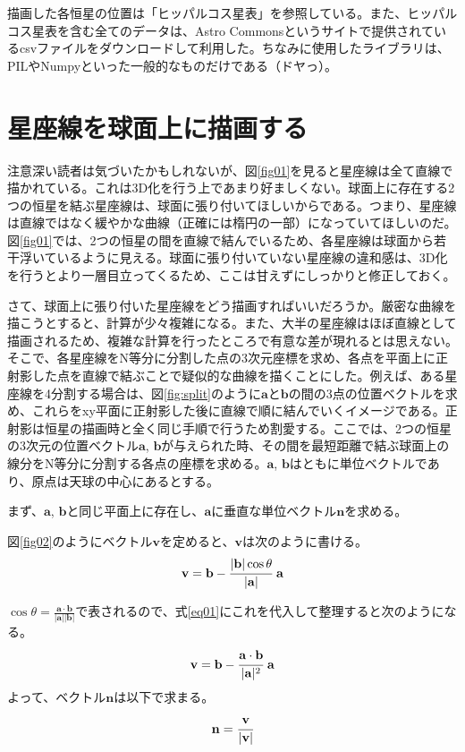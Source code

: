 \documentclass[../main]{subfiles}
\begin{document}
描画した各恒星の位置は「ヒッパルコス星表」を参照している。また、ヒッパルコス星表を含む全てのデータは、Astro Commons\cite{bib04}というサイトで提供されているcsvファイルをダウンロードして利用した。ちなみに使用したライブラリは、PILやNumpyといった一般的なものだけである（ドヤっ）。


\section{星座線を球面上に描画する}
注意深い読者は気づいたかもしれないが、図\ref{fig01}を見ると星座線は全て直線で描かれている。これは3D化を行う上であまり好ましくない。球面上に存在する2つの恒星を結ぶ星座線は、球面に張り付いてほしいからである。つまり、星座線は直線ではなく緩やかな曲線（正確には楕円の一部）になっていてほしいのだ。図\ref{fig01}では、2つの恒星の間を直線で結んでいるため、各星座線は球面から若干浮いているように見える。球面に張り付いていない星座線の違和感は、3D化を行うとより一層目立ってくるため、ここは甘えずにしっかりと修正しておく。

さて、球面上に張り付いた星座線をどう描画すればいいだろうか。厳密な曲線を描こうとすると、計算が少々複雑になる。また、大半の星座線はほぼ直線として描画されるため、複雑な計算を行ったところで有意な差が現れるとは思えない。そこで、各星座線をN等分に分割した点の3次元座標を求め、各点を平面上に正射影した点を直線で結ぶことで疑似的な曲線を描くことにした。例えば、ある星座線を4分割する場合は、図\ref{fig:split}のように$\mathbf{a}$と$\mathbf{b}$の間の3点の位置ベクトルを求め、これらをxy平面に正射影した後に直線で順に結んでいくイメージである。正射影は恒星の描画時と全く同じ手順で行うため割愛する。ここでは、2つの恒星の3次元の位置ベクトル$\mathbf{a}$, $\mathbf{b}$が与えられた時、その間を最短距離で結ぶ球面上の線分をN等分に分割する各点の座標を求める。$\mathbf{a}$, $\mathbf{b}$はともに単位ベクトルであり、原点は天球の中心にあるとする。

まず、$\mathbf{a}$, $\mathbf{b}$と同じ平面上に存在し、$\mathbf{a}$に垂直な単位ベクトル$\mathbf{n}$を求める。

図\ref{fig02}のようにベクトル$\mathbf{v}$を定めると、$\mathbf{v}$は次のように書ける。
\begin{eqnarray}
  \mathbf{v} = \mathbf{b} - \cfrac{|\mathbf{b}|\cos{\theta}}{|\mathbf{a}|}\ \mathbf{a}  \label{eq01}
\end{eqnarray}

$\cos{\theta} = \frac{ \mathbf{a} \cdot \mathbf{b} }{ |\mathbf{a}| |\mathbf{b} |}$で表されるので、式\ref{eq01}にこれを代入して整理すると次のようになる。
\[
  \mathbf{v} = \mathbf{b} - \cfrac{\mathbf{a} \cdot \mathbf{b}}{|\mathbf{a}|^2}\  \mathbf{a}
\]
よって、ベクトル$\mathbf{n}$は以下で求まる。
\[
  \mathbf{n} = \cfrac{\mathbf{v}}{|\mathbf{v}|}
\]
\end{document}

